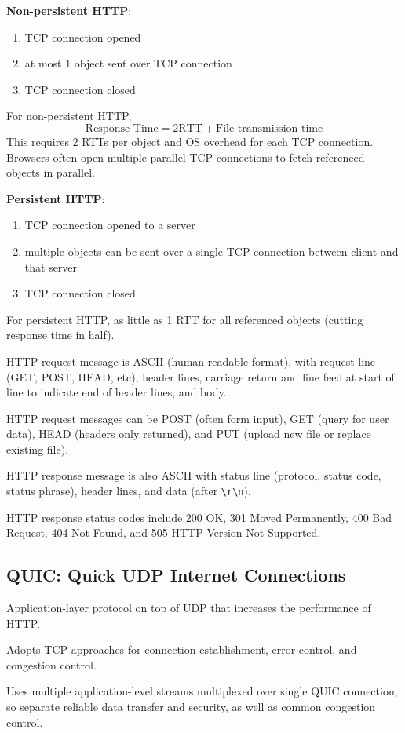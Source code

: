 \documentclass[11pt]{article}
\begin{document}
\textbf{Non-persistent HTTP}:
\begin{enumerate}
\item TCP connection opened
\item at most 1 object sent over TCP connection
\item TCP connection closed
\end{enumerate}

For non-persistent HTTP,
$$ \text{Response Time} = 2 \text{RTT} + \text{File transmission time} $$
This requires 2 RTTs per object and OS overhead for each TCP connection.
Browsers often open multiple parallel TCP connections to fetch referenced objects in parallel.

\textbf{Persistent HTTP}:
\begin{enumerate}
\item TCP connection opened to a server
\item multiple objects can be sent over a single TCP connection between client and that server
\item TCP connection closed
\end{enumerate}

For persistent HTTP, as little as 1 RTT for all referenced objects (cutting response time in half).

HTTP request message is ASCII (human readable format), with request line (GET, POST, HEAD, etc),
header lines, carriage return and line feed at start of line to indicate end of header lines, and
body.

HTTP request messages can be POST (often form input), GET (query for user data),
HEAD (headers only returned), and PUT (upload new file or replace existing file).

HTTP response message is also ASCII with status line (protocol, status code, status phrase),
header lines, and data (after \texttt{\textbackslash{}r\textbackslash{}n}).

HTTP response status codes include 200 OK, 301 Moved Permanently, 400 Bad Request, 404 Not Found, and
505 HTTP Version Not Supported.
\subsection{QUIC: Quick UDP Internet Connections}
\label{sec:orgdc9e1d3}
Application-layer protocol on top of UDP that increases the performance of HTTP.

Adopts TCP approaches for connection establishment, error control, and congestion control.

Uses multiple application-level streams multiplexed over single QUIC connection, so separate
reliable data transfer and security, as well as common congestion control.
\end{document}
